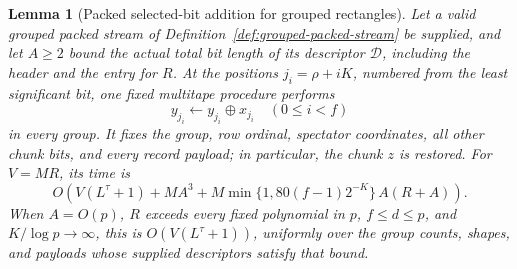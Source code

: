 \documentclass[11pt]{article}
\newtheorem{lemma}[theorem]{Lemma}
\theoremstyle{definition}
\begin{document}
\begin{lemma}[Packed selected-bit addition for grouped rectangles]
\label{lem:packed-selected-bit-addition}
Let a valid grouped packed stream of
Definition~\ref{def:grouped-packed-stream} be supplied, and let $A\ge2$
bound the actual total bit length of its descriptor $\mathcal D$,
including the header and the entry for $R$. At the positions
$j_i=\rho+iK$, numbered from the least significant bit, one fixed
multitape procedure performs
\[
 y_{j_i}\longleftarrow y_{j_i}\mathbin\oplus x_{j_i}
 \quad(0\le i<f)
\]
in every group. It fixes the group, row ordinal, spectator coordinates,
all other chunk bits, and every record payload; in particular, the chunk
$z$ is restored.
For $V=MR$, its time is
\begin{equation}
\label{eq:packed-selected-time}
 O\!\left(V(L^\tau+1)+MA^3+
       M\min\{1,80(f-1)2^{-K}\}\,A(R+A)\right).
\end{equation}
When $A=O(p)$, $R$ exceeds every fixed polynomial in $p$,
$f\le d\le p$, and $K/\log p\to\infty$, this is
$O(V(L^\tau+1))$, uniformly over the group counts, shapes, and payloads
whose supplied descriptors satisfy that bound.
\end{lemma}
\end{document}
